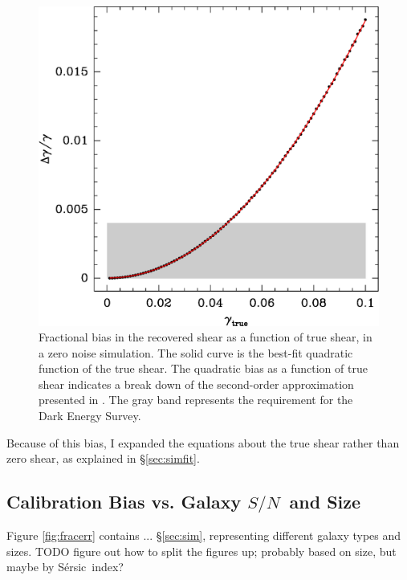 \documentclass[12pt,preprint]{aastex}
\newcommand{\sn}{$S/N$}
\newcommand{\sersic}{S\'{e}rsic}
\begin{document}
\begin{figure}[t] \centering
 \centering 
 \includegraphics[scale=0.6]{figures/fracerr-vs-shear.eps}

 \caption{Fractional bias in the recovered shear as a function of true shear,
     in a zero noise simulation.  The solid curve is the best-fit quadratic
     function of the true shear.  The quadratic bias as a function of true
     shear indicates a break down of the second-order approximation presented
     in \cite{ba14}. The gray band represents the requirement for the Dark
     Energy Survey. \label{fig:nonoise}}

\end{figure}

Because of this bias, I expanded the equations about the true shear rather than
zero shear, as explained in \S \ref{sec:simfit}.

\subsection{Calibration Bias vs. Galaxy \sn\ and Size} \label{sec:snbias}

Figure \ref{fig:fracerr} contains ...  \S \ref{sec:sim}, representing different
galaxy types and sizes.  TODO figure out how to split the figures up; probably
based on size, but maybe by \sersic\ index?
\end{document}
